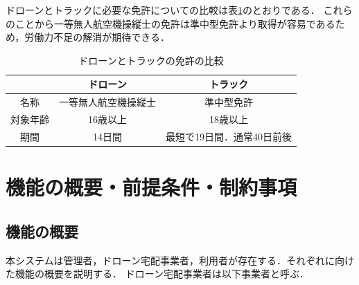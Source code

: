 \documentclass[a4paper, titlepage]{jsarticle}
\begin{document}
ドローンとトラックに必要な免許についての比較は表\ref{tab:drone_or_track}のとおりである．
これらのことから一等無人航空機操縦士の免許は準中型免許より取得が容易であるため，労働力不足の解消が期待できる．
\begin{table}[H]
  \centering
  \caption{ドローンとトラックの免許の比較}
  \label{tab:drone_or_track}
  \begin{tabular}{c|c|c}\hline
    & ドローン & トラック\\\hline\hline
    名称 & 一等無人航空機操縦士 & 準中型免許\\\hline
    対象年齢 & 16歳以上\cite{nipponkaiji_shikaku} & 18歳以上\cite{truckingAssociation} \\\hline
    期間 & 14日間\cite{kddi_drone_academy} & 最短で19日間．通常40日前後\cite{kochi_track} \\\hline
  \end{tabular}
\end{table}


\section{機能の概要・前提条件・制約事項}
\subsection{機能の概要}
本システムは管理者，ドローン宅配事業者，利用者が存在する．それぞれに向けた機能の概要を説明する．
ドローン宅配事業者は以下事業者と呼ぶ．
\end{document}
